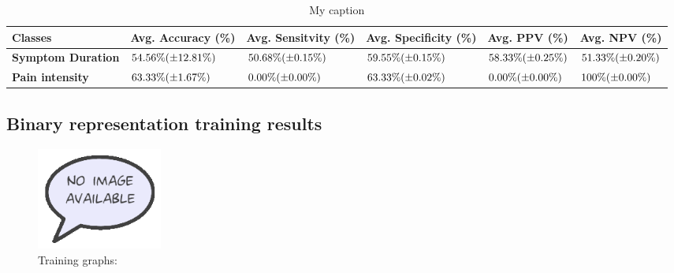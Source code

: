 \documentclass[12pt,a4paper]{article}
\begin{document}
\begin{table}[H]
\centering
\begin{tabular}{|p{2cm}|p{2.2cm}|p{2.2cm}|p{2.2cm}|p{2cm}|p{2cm}|}
\hline
\textbf{Classes}          & \textbf{Avg. Accuracy (\%)} & \textbf{Avg. Sensitvity (\%)} & \textbf{Avg. Specificity (\%)} & \textbf{Avg. PPV (\%)} & \textbf{Avg. NPV (\%)} \\ \hline
\textbf{Symptom Duration} & $54.56\%\newline(\pm12.81\%)$ & $50.68\%\newline(\pm0.15\%)$ & $59.55\%\newline(\pm0.15\%)$ & $58.33\%\newline(\pm0.25\%)$ & $51.33\%\newline(\pm0.20\%)$ \\ \hline
\textbf{Pain intensity}   & $63.33\%\newline(\pm1.67\%)$ & $0.00\%\newline(\pm0.00\%)$ & $63.33\%\newline(\pm0.02\%)$ & $0.00\%\newline(\pm0.00\%)$ & $100\%\newline(\pm0.00\%)$ \\ \hline
\end{tabular}
\label{my-label}
\caption{My caption}
\end{table}

\subsection{Binary representation training results}
\begin{figure} [H]
\centering
\includegraphics[width=0.2\textwidth]{figures/missimage}
\caption{Training graphs:}
\label{fig:binaryGraph}  
\end{figure}
\end{document}
